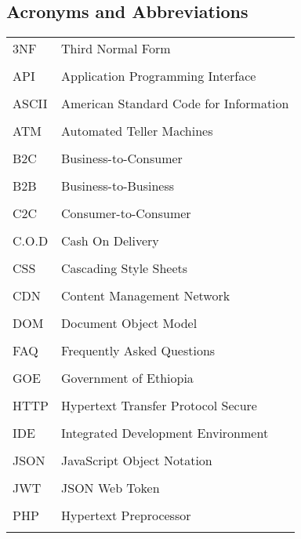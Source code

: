 \begin{center}
\section*{Acronyms and Abbreviations}
\end{center}


\begin{tabular}{p{3cm}p{11cm}}
3NF &Third Normal Form \\
\\
API & Application Programming Interface \\
\\
ASCII & American Standard Code for Information \\
\\
ATM & Automated Teller Machines \\
\\
B2C & Business-to-Consumer \\
\\
B2B & Business-to-Business\\
\\
C2C & Consumer-to-Consumer \\
\\
C.O.D & Cash On Delivery \\
\\
CSS & Cascading Style Sheets \\
\\
CDN & Content Management Network \\
\\
DOM & Document Object Model \\
\\
FAQ & Frequently Asked Questions \\
\\
GOE & Government of Ethiopia \\
\\
HTTP & Hypertext Transfer Protocol Secure \\
\\
IDE & Integrated Development Environment \\
\\
JSON & JavaScript Object Notation \\
\\
JWT & JSON Web Token \\
\\
PHP & Hypertext Preprocessor \\
\\

\end{tabular}



